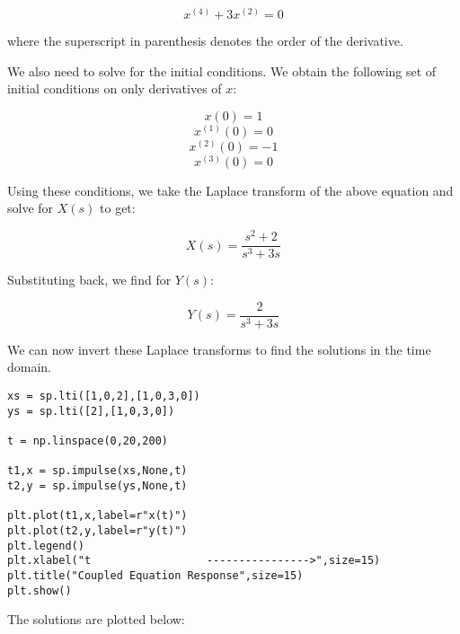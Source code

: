 \documentclass[11pt]{article}
\begin{document}
\[x^{(4)} + 3x^{(2)} = 0\]

where the superscript in parenthesis denotes the order of the
derivative.

We also need to solve for the initial conditions. We obtain the
following set of initial conditions on only derivatives of \(x\):

\[x(0) = 1\] \[x^{(1)}(0) = 0\] \[x^{(2)}(0) = -1\] \[x^{(3)}(0) = 0\]

Using these conditions, we take the Laplace transform of the above
equation and solve for \(X(s)\) to get:

\[X(s) = \frac{s^2+2}{s^3+3s}\]

Substituting back, we find for \(Y(s)\):

\[Y(s) = \frac{2}{s^3+3s}\]

We can now invert these Laplace transforms to find the solutions in the
time domain. 
		
	
	\begin{Verbatim}
xs = sp.lti([1,0,2],[1,0,3,0])
ys = sp.lti([2],[1,0,3,0])

t = np.linspace(0,20,200)

t1,x = sp.impulse(xs,None,t)
t2,y = sp.impulse(ys,None,t)

plt.plot(t1,x,label=r"x(t)")
plt.plot(t2,y,label=r"y(t)")
plt.legend()
plt.xlabel("t                  ---------------->",size=15)
plt.title("Coupled Equation Response",size=15)
plt.show()

\end{Verbatim}

	

	

	
\newpage	
The solutions are plotted below:

	

	

    \begin{center}
    \end{center}
    { \hspace*{\fill} \\}
    
	
		
\end{document}
